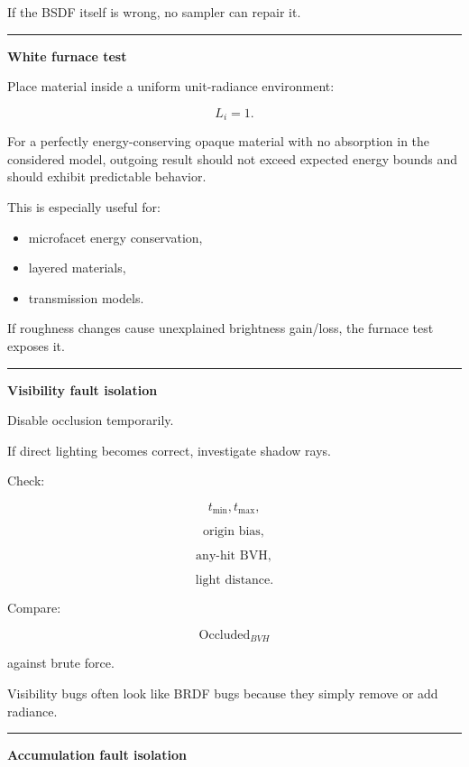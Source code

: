 If the BSDF itself is wrong, no sampler can repair it.

\begin{center}\rule{0.5\linewidth}{0.5pt}\end{center}

\textbf{White furnace test}

Place material inside a uniform unit-radiance environment:

\[
L_i=1.
\]

For a perfectly energy-conserving opaque material with no absorption in the considered model, outgoing result should not exceed expected energy bounds and should exhibit predictable behavior.

This is especially useful for:

\begin{itemize}
\tightlist
\item
  microfacet energy conservation,
\item
  layered materials,
\item
  transmission models.
\end{itemize}

If roughness changes cause unexplained brightness gain/loss, the furnace test exposes it.

\begin{center}\rule{0.5\linewidth}{0.5pt}\end{center}

\textbf{Visibility fault isolation}

Disable occlusion temporarily.

If direct lighting becomes correct, investigate shadow rays.

Check:

\[
t_{\min},
t_{\max},
\]

\[
\text{origin bias},
\]

\[
\text{any-hit BVH},
\]

\[
\text{light distance}.
\]

Compare:

\[
\operatorname{Occluded}_{BVH}
\]

against brute force.

Visibility bugs often look like BRDF bugs because they simply remove or add radiance.

\begin{center}\rule{0.5\linewidth}{0.5pt}\end{center}

\textbf{Accumulation fault isolation}

